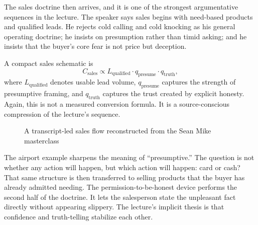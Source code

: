 The sales doctrine then arrives, and it is one of the strongest argumentative sequences in the lecture. The speaker says sales begins with need-based products and qualified leads. He rejects cold calling and cold knocking as his general operating doctrine; he insists on presumption rather than timid asking; and he insists that the buyer's core fear is not price but deception.

A compact sales schematic is
\begin{equation}
C_{\mathrm{sales}}\propto L_{\mathrm{qualified}}\cdot q_{\mathrm{presume}}\cdot q_{\mathrm{truth}},
\end{equation}
where \(L_{\mathrm{qualified}}\) denotes usable lead volume, \(q_{\mathrm{presume}}\) captures the strength of presumptive framing, and \(q_{\mathrm{truth}}\) captures the trust created by explicit honesty. Again, this is not a measured conversion formula. It is a source-conscious compression of the lecture's sequence.

\begin{figure}[h]
\centering
{}
\caption{A transcript-led sales flow reconstructed from the Sean Mike masterclass}
\end{figure}

The airport example sharpens the meaning of ``presumptive.'' The question is not whether any action will happen, but which action will happen: card or cash? That same structure is then transferred to selling products that the buyer has already admitted needing. The permission-to-be-honest device performs the second half of the doctrine. It lets the salesperson state the unpleasant fact directly without appearing slippery. The lecture's implicit thesis is that confidence and truth-telling stabilize each other.

